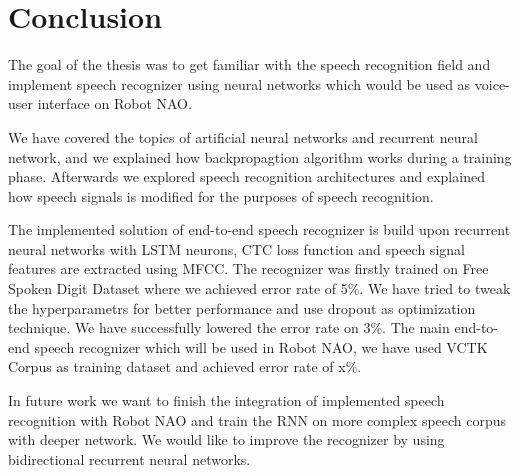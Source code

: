 \chapter{Conclusion}

The goal of the thesis was to get familiar with the speech recognition field and implement speech recognizer using neural networks which would be used as voice-user interface on Robot NAO.

We have covered the topics of artificial neural networks and recurrent neural network, and we explained how backpropagtion algorithm works during a training phase.
Afterwards we explored speech recognition architectures and explained how speech signals is modified for the purposes of speech recognition.

The implemented solution of end-to-end speech recognizer is build upon recurrent neural networks with LSTM neurons, CTC loss function and speech signal features are extracted using MFCC.
The recognizer was firstly trained on Free Spoken Digit Dataset where we achieved error rate of 5\%.
We have tried to tweak the hyperparametrs for better performance and use dropout as optimization technique.
We have successfully lowered the error rate on 3\%.
The main end-to-end speech recognizer which will be used in Robot NAO, we have used VCTK Corpus as training dataset and achieved error rate of x\%.

In future work we want to finish the integration of implemented speech recognition with Robot NAO and train the RNN on more complex speech corpus with deeper network.
We would like to improve the recognizer by using bidirectional recurrent neural networks.

